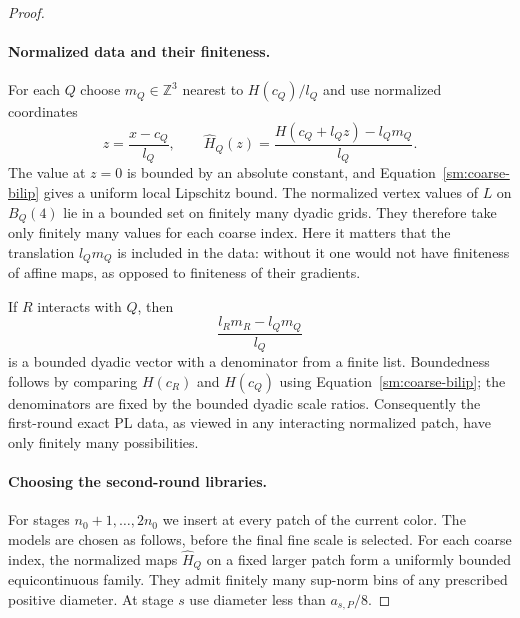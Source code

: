 \documentclass[11pt]{article}
\numberwithin{equation}{section}
\theoremstyle{definition}
\theoremstyle{remark}
\newcommand{\Z}{\mathbb Z}
\begin{document}
\begin{proof}
\paragraph{Normalized data and their finiteness.}
For each $Q$ choose $m_Q\in\Z^3$ nearest to
$H(c_Q)/l_Q$ and use normalized coordinates
\begin{equation}
 \label{sm:normalization}
 z=\frac{x-c_Q}{l_Q},\qquad
 \widehat H_Q(z)=\frac{H(c_Q+l_Qz)-l_Qm_Q}{l_Q}.
\end{equation}
The value at $z=0$ is bounded by an absolute constant,
and Equation~\eqref{sm:coarse-bilip} gives a uniform local
Lipschitz bound.  The normalized vertex values of $L$
on $B_Q(4)$ lie in a bounded set on finitely many
dyadic grids.  They therefore take only finitely many
values for each coarse index.  Here it matters that
the translation $l_Qm_Q$ is included in the data:
without it one would not have finiteness of affine
maps, as opposed to finiteness of their gradients.

If $R$ interacts with $Q$, then
\begin{equation}
 \label{sm:relative-origins}
 \frac{l_Rm_R-l_Qm_Q}{l_Q}
\end{equation}
is a bounded dyadic vector with a denominator from a
finite list.  Boundedness follows by comparing
$H(c_R)$ and $H(c_Q)$ using Equation~\eqref{sm:coarse-bilip};
the denominators are fixed by the bounded dyadic
scale ratios.  Consequently the first-round exact
PL data, as viewed in any interacting normalized
patch, have only finitely many possibilities.

\paragraph{Choosing the second-round libraries.}
For stages $n_0+1,\ldots,2n_0$ we insert at every
patch of the current color.  The models are chosen
as follows, before the final fine scale is selected.
For each coarse index, the normalized maps
$\widehat H_Q$ on a fixed larger patch form a
uniformly bounded equicontinuous family.  They
admit finitely many sup-norm bins of any prescribed
positive diameter.  At stage $s$ use diameter less
than $a_{s,P}/8$.


\end{proof}
\end{document}
